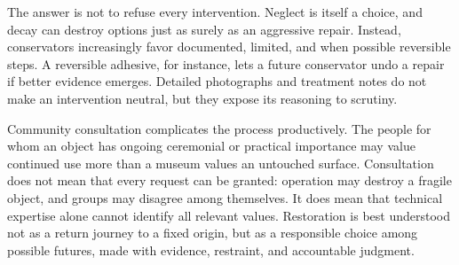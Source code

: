The answer is not to refuse every intervention. Neglect is itself a choice, and
decay can destroy options just as surely as an aggressive repair. Instead,
conservators increasingly favor documented, limited, and when possible reversible
steps. A reversible adhesive, for instance, lets a future conservator undo a
repair if better evidence emerges. Detailed photographs and treatment notes do
not make an intervention neutral, but they expose its reasoning to scrutiny.

Community consultation complicates the process productively. The people for whom
an object has ongoing ceremonial or practical importance may value continued use
more than a museum values an untouched surface. Consultation does not mean that
every request can be granted: operation may destroy a fragile object, and groups
may disagree among themselves. It does mean that technical expertise alone
cannot identify all relevant values. Restoration is best understood not as a
return journey to a fixed origin, but as a responsible choice among possible
futures, made with evidence, restraint, and accountable judgment.


